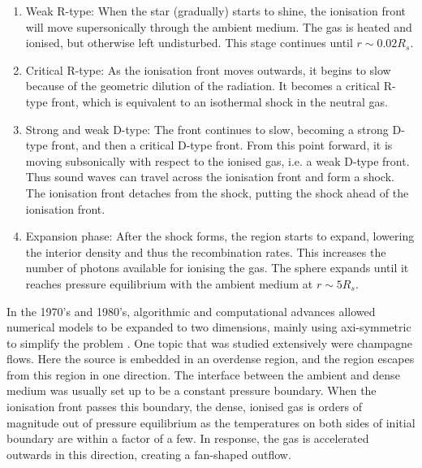 \documentclass[useAMS,usenatbib]{mn2e}
\begin{document}
\begin{enumerate}
\item Weak R-type:  When the star (gradually) starts to shine, the
  ionisation front will move supersonically through the ambient
  medium.  The gas is heated and ionised, but otherwise left
  undisturbed.  This stage continues until $r \sim 0.02R_s$.
\item Critical R-type:  As the ionisation front moves outwards, it
  begins to slow because of the geometric dilution of the radiation.
  It becomes a critical R-type front, which is equivalent to an
  isothermal shock in the neutral gas.
\item Strong and weak D-type:  The front continues to slow, becoming a
  strong D-type front, and then a critical D-type front.  From this
  point forward, it is moving subsonically with respect to the ionised
  gas, i.e. a weak D-type front.  Thus sound waves can travel across
  the ionisation front and form a shock.  The ionisation front
  detaches from the shock, putting the shock ahead of the ionisation
  front.
\item Expansion phase:  After the shock forms, the \hii region
  starts to expand, lowering the interior density and thus the
  recombination rates.  This increases the number of photons available
  for ionising the gas.  The sphere expands until it reaches pressure
  equilibrium with the ambient medium at $r \sim 5R_s$.
\end{enumerate}
%

In the 1970's and 1980's, algorithmic and computational advances
allowed numerical models to be expanded to two dimensions, mainly
using axi-symmetric to simplify the problem
\citep[e.g.][]{Bodenheimer79, Sandford82, Yorke83}.  One topic that was
studied extensively were champagne flows.  Here the source is embedded
in an overdense region, and the \hii region escapes from this
region in one direction.  The interface between the ambient and dense
medium was usually set up to be a constant pressure boundary.  When
the ionisation front passes this boundary, the dense, ionised gas is
orders of magnitude out of pressure equilibrium as the temperatures on
both sides of initial boundary are within a factor of a few.  In
response, the gas is accelerated outwards in this direction, creating
a fan-shaped outflow.
\end{document}
